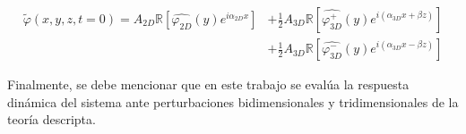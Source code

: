 \begin{equation}
\begin{aligned}
\widetilde{\varphi}(x,y,z,t=0) = A_{2D} \mathbb{R} \left[ \widehat{\varphi^{}_{2D}}(y) e^{\mathit{i} \alpha_{2D} x} \right] &+ \frac{1}{2} A_{3D} \mathbb{R} \left[ \widehat{\varphi^{+}_{3D}}(y) e^{\mathit{i} ( \alpha_{3D} x + \beta z)} \right] \\
 &+ \frac{1}{2} A_{3D} \mathbb{R} \left[ \widehat{\varphi^{-}_{3D}}(y) e^{\mathit{i} ( \alpha_{3D} x - \beta z)} \right]
\end{aligned}
\label{eq:init_con_3}
\end{equation}

Finalmente, se debe mencionar que en este trabajo se evalúa la respuesta dinámica del sistema ante perturbaciones bidimensionales y tridimensionales de la teoría descripta.